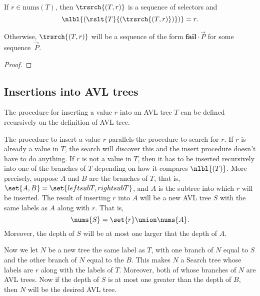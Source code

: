 \begin{definition}
\begin{theorem}
If $r \in \text{nums}(T)$, then $\trsrch{(T,r)}$ is a sequence of
selectors and
\[
\nlbl{(\rslt{T}{(\trsrch{(T,r)})})} = r.
\]

Otherwise, $\trsrch{(T,r)}$ will be a sequence of the form
$\textbf{fail}\cdot \vec{P}$ for some sequence~$\vec{P}$.
\end{theorem}

\begin{proof}


\end{proof}

\subsection{Insertions into AVL trees}
The procedure for inserting a value $r$ into an AVL tree $T$ can be
defined recursively on the definition of AVL tree.  

\iffalse The other technicality comes about because we will be taking
a tree and defining a new tree sharing some of its subtrees.  To avoid
sharing in the new tree, the recursive definition we will need trees
that are combinations of subtrees trees using subtrees of 

The insertion
procedure is usually described as a process of rearranging the
``links'' that hold $T$ together.
\fi

The procedure to insert a value $r$ parallels the procedure to search
for $r$.  If $r$ is already a value in $T$, the search will discover
this and the insert procedure doesn't have to do anything.  If $r$ is
not a value in $T$, then it has to be inserted recursively into one of
the branches of $T$ depending on how it compares $\nlbl{(T)}$.  More
precisely, suppose $A$ and $B$ are the branches of $T$, that is,
$\set{A,B}= \set{leftsub{T}, rightsub{T}}$, and $A$ is the subtree
into which $r$ will be inserted.  The result of inserting $r$ into $A$
will be a new AVL tree $S$ with the same labels as $A$ along with $r$.
That is,
\[
\nums{S} = \set{r} \union \nums{A}.
\]
Moreover, the depth of $S$ will be at most one larger that the depth
of $A$.

Now we let $N$ be a new tree the same label as $T$, with one branch of
$N$ equal to $S$ and the other branch of $N$ equal to the $B$.  This
makes $N$ a Search tree whose labels are $r$ along with the labels of
$T$.  Moreover, both of whose branches of $N$ are AVL trees.  Now if
the depth of $S$ is at most one greater than the depth of $B$, then
$N$ will be the desired AVL tree.


\end{definition}

